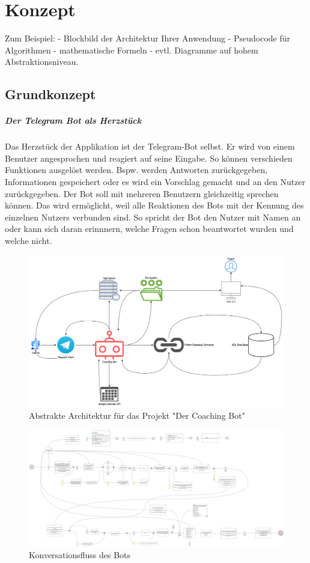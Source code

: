\chapter{Konzept}

Zum Beispiel:  
- Blockbild der Architektur Ihrer Anwendung  
- Pseudocode für Algorithmen  
- mathematische Formeln  
- evtl. Diagramme auf hohem Abstraktionsniveau.  

\section{Grundkonzept}

	\paragraph{Der Telegram Bot als Herzstück}
 	Das Herzstück der Applikation ist der Telegram-Bot selbst. Er wird von einem Benutzer angesprochen und reagiert auf seine Eingabe. So können verschieden Funktionen ausgelöst werden. Bspw. werden Antworten zurückgegeben, Informationen gespeichert oder es wird ein Vorschlag gemacht und an den Nutzer zurückgegeben. Der Bot soll mit mehreren Benutzern gleichzeitig sprechen können. Das wird ermöglicht, weil alle Reaktionen des Bots mit der Kennung des einzelnen Nutzers verbunden sind. So spricht der Bot den Nutzer mit Namen an oder kann sich daran erinnnern, welche Fragen schon beantwortet wurden und welche nicht. 
	 
	 


 \begin{figure} %
	\centering
	\includegraphics{images/220213_PA28464_Architecture.png}
	\caption{Abstrakte Architektur für das Projekt "Der Coaching Bot"}
	\label{architecture}
\end{figure}


\begin{figure} %
	\centering
	\includegraphics{images/220213_PA28464_Conversation_Flow.png}
	\caption{Konversationsfluss des Bots}
	\label{conversationFlow}
\end{figure}

